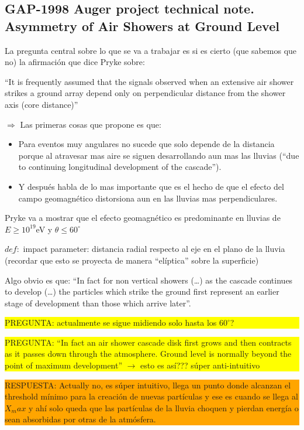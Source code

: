 \subsection{GAP-1998 Auger project technical note. Asymmetry of Air Showers at Ground Level \cite{paper_1998}}

La pregunta central sobre lo que se va a trabajar es si es cierto (que sabemos que no) la afirmación que dice Pryke sobre:

“It is frequently assumed that the signals observed when an extensive air shower strikes a ground array depend only on perpendicular distance from the shower axis (core distance)”

$\Rightarrow$ Las primeras cosas que propone es que:

\begin{itemize}
    \item Para eventos muy angulares no sucede que solo depende de la distancia porque al atravesar mas aire se siguen desarrollando aun mas las lluvias (“due to continuing longitudinal development of the cascade”).
    \item Y después habla de lo mas importante que es el hecho de que el efecto del campo geomagnético distorsiona aun en las lluvias mas perpendiculares.
\end{itemize}

Pryke va a mostrar que el efecto geomagnético es predominante en lluvias de $E \geq 10^{19}$eV y $\theta \leq 60^\circ$

$\underline{def:}$ impact parameter: distancia radial respecto al eje en el plano de la lluvia (recordar que esto se proyecta de manera “elíptica” sobre la superficie)

Algo obvio es que: “In fact for non vertical showers (…) as the cascade continues to develop (…) the particles which strike the ground first represent an earlier stage of development than those which arrive later”.

\colorbox{yellow}{
  \parbox{\dimexpr\textwidth-2\fboxsep}{%
  PREGUNTA: actualmente se sigue midiendo solo hasta los $60^\circ$?}}

\colorbox{yellow}{
  \parbox{\dimexpr\textwidth-2\fboxsep}{%
  PREGUNTA: “In fact an air shower cascade disk first grows and then contracts as it passes down through the atmosphere. Ground level is normally beyond the point of maximum development” $\rightarrow$ esto es así??? súper anti-intuitivo
}}

\colorbox{orange}{
  \parbox{\dimexpr\textwidth-2\fboxsep}{%
  RESPUESTA: Actually no, es súper intuitivo, llega un punto donde alcanzan el threshold mínimo para la creación de nuevas partículas y ese es cuando se llega al $X_max$ y ahí solo queda que las partículas de la lluvia choquen y pierdan energía o sean absorbidas por otras de la atmósfera.
}}

